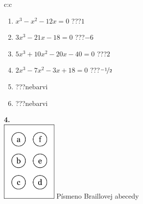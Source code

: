 \documentclass[10pt]{report}
\begin{document}
\begin{tabular}{c:c}
\begin{minipage}[c][104.5mm][t]{0.5\linewidth}
\begin{center}
\begin{minipage}{0.79\linewidth}
\begin{center}
\begin{varwidth}{\linewidth}
\begin{enumerate}
\Large
\item $x^3-x^2-12x=0$\quad \dotfill\; ???\;\dotfill \quad $1$
\item $3x^3-21x-18=0$\quad \dotfill\; ???\;\dotfill \quad $-6$
\item $5x^3+10x^2-20x-40=0$\quad \dotfill\; ???\;\dotfill \quad $2$
\item $2x^3-7x^2-3x+18=0$\quad \dotfill\; ???\;\dotfill \quad $\nicefrac{-1}{2}$
\item \quad \dotfill\; ???\;\dotfill \quad nebarvi
\item \quad \dotfill\; ???\;\dotfill \quad nebarvi
\end{enumerate}
\end{varwidth}
\end{center}
\end{minipage}
\begin{minipage}{0.20\linewidth}
\begin{center}
{\Huge\bfseries 4.} \\[2mm]
\includegraphics[height=40mm]{../images/braille.png}
{\small Písmeno Braillovej abecedy}
\end{center}
\end{minipage}
\end{center}
\end{minipage}
%
\end{tabular}
\newpage
\thispagestyle{empty}
\end{document}
